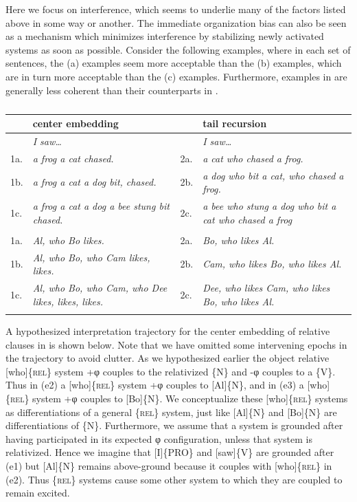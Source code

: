   Here we focus on interference, which seems to underlie many of the factors listed above in some way or another. The immediate organization bias can also be seen as a mechanism which minimizes interference by stabilizing newly activated systems as soon as possible. Consider the following examples, where in each set of sentences, the (a) examples seem more acceptable than the (b) examples, which are in turn more acceptable than the (c) examples. Furthermore, examples in  are generally less coherent than their counterparts in .  

\begin{table}
\begin{tabularx}{\textwidth}{lQlQ} 
\lsptoprule
& \textbf{center embedding} &  & \textbf{tail recursion}\\
\midrule 
& \textit{I saw…} &  & \textit{I saw…}\\
1a. & \textit{a frog a cat chased.} & 2a. & \textit{a cat who chased a frog.}\\
1b. & \textit{a frog a cat a dog bit, chased.} & 2b. & \textit{a dog who bit a cat, who chased a frog.}\\
1c. & \textit{a frog a cat a dog a bee stung bit chased.} & 2c. & \textit{a bee who stung a dog who bit a cat who chased a frog}\\
&  &  & \\
1a. & \textit{Al, who Bo likes.} & 2a. & \textit{Bo, who likes Al.}\\
1b. & \textit{Al, who Bo, who Cam likes, likes.} & 2b. & \textit{Cam, who likes Bo, who likes Al.}\\
1c. & \textit{Al, who Bo, who Cam, who Dee likes, likes, likes.} & 2c. & \textit{Dee, who likes Cam, who likes Bo, who likes Al.}\\
\lspbottomrule
\end{tabularx}
\caption{\missingcaption}\label{tab:key:}
\end{table}
  A hypothesized interpretation trajectory for the center embedding of relative clauses in  is shown below. Note that we have omitted some intervening epochs in the trajectory to avoid clutter. As we hypothesized earlier the object relative [who]\{\textsc{rel}\} system +φ couples to the relativized \{N\} and -φ couples to a \{V\}. Thus in (e2) a [who]\{\textsc{rel}\} system +φ couples to [Al]\{N\}, and in (e3) a [who]\{\textsc{rel}\} system +φ couples to [Bo]\{N\}. We conceptualize these [who]\{\textsc{rel}\} systems as differentiations of a general \{\textsc{rel}\} system, just like [Al]\{N\} and [Bo]\{N\} are differentiations of \{N\}. Furthermore, we assume that a system is grounded after having participated in its expected φ configuration, unless that system is relativized. Hence we imagine that [I]\{\textsc{PRO}\} and [saw]\{V\} are grounded after (e1) but [Al]\{N\} remains above-ground because it couples with [who]\{\textsc{rel}\} in (e2). Thus \{\textsc{rel}\} systems cause some other system to which they are coupled to remain excited.

